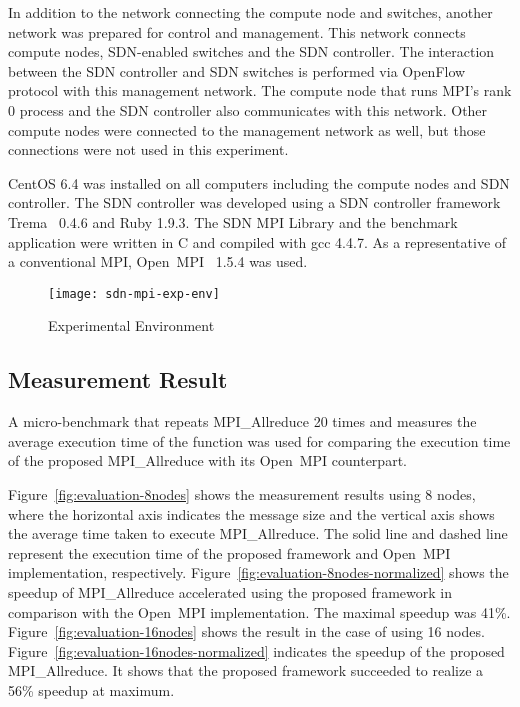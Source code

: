 In addition to the network connecting the compute node and switches,
another network was prepared for control and management. This network
connects compute nodes, SDN-enabled switches and the SDN controller.
The interaction between the SDN controller and SDN switches is performed
via OpenFlow protocol with this management network. The compute node
that runs MPI's rank 0 process and the SDN controller also communicates
with this network. Other compute nodes were connected to the
management network as well, but those connections were not used in this
experiment.

CentOS 6.4 was installed on all computers including the compute nodes and
SDN controller. The SDN controller was developed using a SDN controller
framework Trema~\autocite{trema} 0.4.6 and Ruby 1.9.3. The SDN
MPI Library and the benchmark application were written in C and
compiled with gcc 4.4.7. As a representative of a conventional MPI,
Open~MPI~\autocite{Gabriel2004} 1.5.4 was used.

\begin{figure}
    \centering
    \texttt{[image: sdn-mpi-exp-env]}
    \caption{Experimental Environment}%
    \label{fig:experiment-environment}
\end{figure}

\subsection{Measurement Result}

A micro-benchmark that repeats MPI\_Allreduce 20
times and measures the average execution time of the function was used
for comparing the execution time of the proposed MPI\_Allreduce
with its Open~MPI counterpart.

Figure~\ref{fig:evaluation-8nodes} shows the measurement results using 8
nodes, where the horizontal axis indicates the message size and the
vertical axis shows the average time taken to execute
MPI\_Allreduce. The solid line and dashed line represent the
execution time of the proposed framework and Open~MPI implementation,
respectively. Figure~\ref{fig:evaluation-8nodes-normalized} shows the speedup
of MPI\_Allreduce accelerated using the proposed framework in comparison with
the Open~MPI implementation. The maximal speedup was 41\%.
Figure~\ref{fig:evaluation-16nodes} shows the result in the case of using 16
nodes. Figure~\ref{fig:evaluation-16nodes-normalized} indicates the speedup of
the proposed MPI\_Allreduce. It shows that the proposed framework succeeded to
realize a 56\% speedup at maximum.

